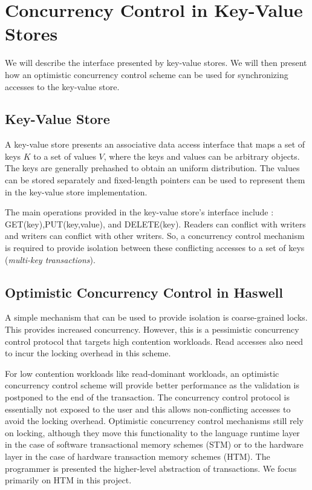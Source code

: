 \section{Concurrency Control in Key-Value Stores} \label{sec:tm}

We will describe the interface presented by key-value stores. We will then
present how an optimistic concurrency control scheme can be used for
synchronizing accesses to the key-value store.

\subsection{Key-Value Store}

A key-value store presents an associative data access interface that maps a set
of keys $K$ to a set of values $V$, where the keys and values can be arbitrary
objects. The keys are generally prehashed to obtain an uniform distribution. The
values can be stored separately and fixed-length pointers can be used to
represent them in the key-value store implementation.  

The main operations provided in the key-value store's interface include :
\textsc{GET}(key),\textsc{PUT}(key,value), and \textsc{DELETE}(key).  Readers
can conflict with writers and writers can conflict with other writers. So, a
concurrency control mechanism is required to provide isolation between these
conflicting accesses to a set of keys (\textit{multi-key transactions}).

\subsection{Optimistic Concurrency Control in Haswell}

A simple mechanism that can be used to provide isolation is coarse-grained
locks. This provides increased concurrency.  However, this is a pessimistic
concurrency control protocol that targets high contention workloads. Read
accesses also need to incur the locking overhead in this scheme. 

For low contention workloads like read-dominant workloads, an optimistic
concurrency control scheme will provide better performance as the validation is
postponed to the end of the transaction. The concurrency control protocol is
essentially not exposed to the user and this allows non-conflicting accesses to
avoid the locking overhead.  Optimistic concurrency control mechanisms still
rely on locking, although they move this functionality to the language runtime
layer in the case of software transactional memory schemes (STM) or to the
hardware layer in the case of hardware transaction memory schemes (HTM). The
programmer is presented the higher-level abstraction of transactions. We focus
primarily on HTM in this project.

